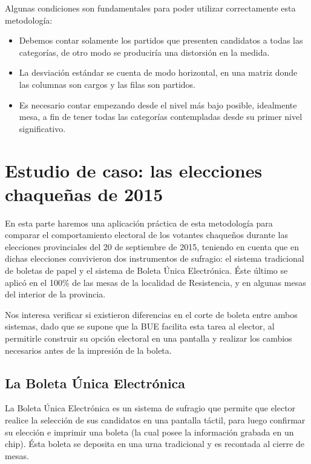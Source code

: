 \documentclass[12pt,a4paper]{article}
\begin{document}
Algunas condiciones son fundamentales para poder utilizar correctamente esta
metodología:

\begin{itemize}
  \item Debemos contar solamente los partidos que presenten candidatos a todas
    las categorías, de otro modo se produciría una distorsión en la medida.
  \item La desviación estándar se cuenta de modo horizontal, en una matriz donde
    las columnas son cargos y las filas son partidos.
  \item Es necesario contar empezando desde el nivel más bajo posible,
    idealmente mesa, a fin de tener todas las categorías contempladas desde su
    primer nivel significativo.
\end{itemize}

\pagebreak

\section{Estudio de caso: las elecciones chaqueñas de 2015}

En esta parte haremos una aplicación práctica de esta metodología para comparar
el comportamiento electoral de los votantes chaqueños durante las elecciones
provinciales del 20 de septiembre de 2015, teniendo en cuenta que en dichas
elecciones convivieron dos instrumentos de sufragio: el sistema tradicional de
boletas de papel y el sistema de Boleta Única Electrónica. Éste último se aplicó
en el 100\% de las mesas de la localidad de Resistencia, y en algunas mesas del
interior de la provincia.

Nos interesa verificar si existieron diferencias en el corte de boleta entre
ambos sistemas, dado que se supone que la BUE facilita esta tarea al elector, al
permitirle construir su opción electoral en una pantalla y realizar los cambios
necesarios antes de la impresión de la boleta.

\subsection{La Boleta Única Electrónica}
La Boleta Única Electrónica es un sistema de sufragio que permite que elector
realice la selección de sus candidatos en una pantalla táctil, para luego
confirmar su elección e imprimir una boleta (la cual posee la información
grabada en un chip). Ésta boleta se deposita en una urna tradicional y es
recontada al cierre de mesas.
\end{document}

